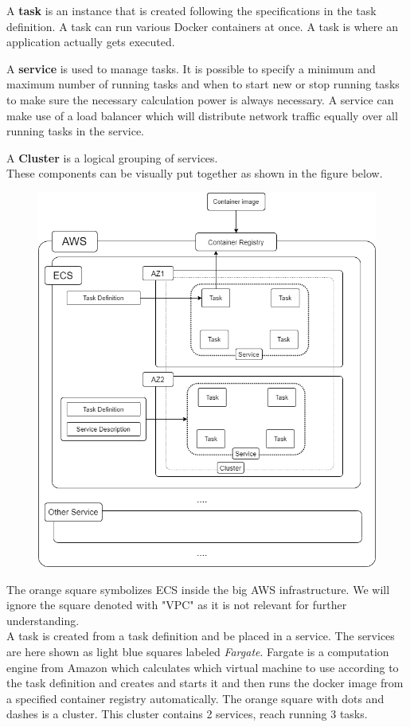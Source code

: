 A \textbf{task} is an instance that is created following the specifications in the task definition. A task can run various Docker containers at once. A task is where an application actually gets executed.

A \textbf{service} is used to manage tasks. It is possible to specify a minimum and maximum number of running tasks and when to start new or stop running tasks to make sure the necessary calculation power is always necessary. A service can make use of a load balancer which will distribute network traffic equally over all running tasks in the service.

A \textbf{Cluster} is a logical grouping of services. \\

These components can be visually put together as shown in the figure below.
\begin{figure}[H]
\centering
\includegraphics[scale=.5]{Bilder/EcsStructure.png}
\label{ex311}
\end{figure}

The orange square symbolizes ECS inside the big AWS infrastructure. We will ignore the square denoted with "VPC" as it is not relevant for further understanding.\\
A task is created from a task definition and be placed in a service. The services are here shown as light blue squares labeled \emph{Fargate}. Fargate is a computation engine from Amazon which calculates which virtual machine to use according to the task definition and creates and starts it and then runs the docker image from a specified container registry automatically. \cite{AwsFargate} The orange square with dots and dashes is a cluster. This cluster contains 2 services, reach running 3 tasks. 

